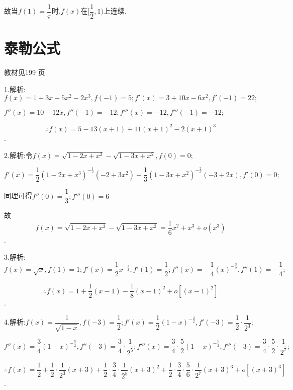 故当$f(1) = \dfrac{1}{\pi }$时,$f(x)$在$[\dfrac{1}{2},1)$上连续.












\section{泰勒公式}
\begin{flushright}
  \color{zhanqing!80}
   教材见199 页 %
\end{flushright}

1.解析:$f(x) = 1 + 3x + 5{x^2} - 2{x^3},f( - 1) = 5;f'(x) = 3 + 10x - 6{x^2},f'( - 1) = 22;$

$f''(x) = 10 - 12x,f''( - 1) =  - 12;f'''(x) =  - 12,f'''( - 1) =  - 12;$

\[\therefore f(x) = 5 - 13(x + 1) + 11{(x + 1)^2} - 2{(x + 1)^3}\].

2.解析:令$f(x) = \sqrt {1 - 2x + {x^3}}  - \sqrt {1 - 3x + {x^2}} ,f(0) = 0;$

$f'(x) = \dfrac{1}{2}{(1 - 2x + {x^3})^{ - \frac{1}{2}}}( - 2 + 3{x^2}) - \dfrac{1}{3}{(1 - 3x + {x^2})^{ - \frac{2}{3}}}( - 3 + 2x),f'(0) = 0;$

同理可得$f''(0) = \dfrac{1}{3};f'''(0) = 6$

故\[f(x) = \sqrt {1 - 2x + {x^3}}  - \sqrt {1 - 3x + {x^2}}  = \frac{1}{6}{x^2} + {x^3} + o({x^3})\].

3.解析:$f(x) = \sqrt x ,f(1) = 1;f'(x) = \dfrac{1}{2}{x^{ - \frac{1}{2}}},f'(1) = \dfrac{1}{2};f''(x) =  - \dfrac{1}{4}{(x)^{ - \frac{3}{2}}},f''(1) =  - \dfrac{1}{4};$

\[ \therefore f(x) = 1 + \dfrac{1}{2}(x - 1) - \dfrac{1}{8}{(x - 1)^2} + o[{(x - 1)^2}]\].

4.解析:$f(x) = \dfrac{1}{{\sqrt {1 - x} }},f( - 3) = \dfrac{1}{2};f'(x) = \dfrac{1}{2}{(1 - x)^{ - \frac{3}{2}}},f'( - 3) = \dfrac{1}{2} \cdot \dfrac{1}{{{2^3}}};$

$f''(x) = \dfrac{3}{4}{(1 - x)^{ - \frac{5}{2}}},f''( - 3) = \dfrac{3}{4} \cdot \dfrac{1}{{{2^5}}};f'''(x) = \dfrac{3}{4} \cdot \dfrac{5}{2}{(1 - x)^{ - \frac{7}{2}}},f'''( - 3) = \dfrac{3}{4} \cdot \dfrac{5}{2} \cdot \dfrac{1}{{{2^7}}};$

\[\therefore f(x) = \dfrac{1}{2} + \dfrac{1}{2} \cdot \dfrac{1}{{{2^3}}}(x + 3) + \dfrac{1}{2} \cdot \dfrac{3}{4} \cdot \dfrac{1}{{{2^5}}}{(x + 3)^2} + \dfrac{1}{2} \cdot \dfrac{3}{4} \cdot \dfrac{5}{6} \cdot \dfrac{1}{{{2^7}}}{(x + 3)^3} + o[{(x + 3)^3}]\].


